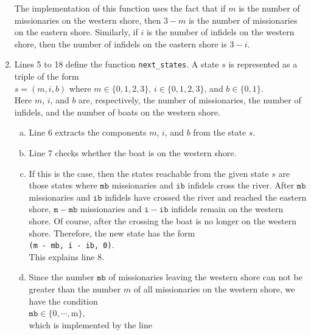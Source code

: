 \begin{enumerate}
      The implementation of this function uses the fact that if $m$ is the number of missionaries on
      the western shore, then $3-m$ is the number of missionaries on the eastern shore.  Similarly,
      if $i$ is the number of infidels on the western shore, then the number of infidels on the
      eastern shore is $3 - i$.
\item Lines 5 to 18 define the function \texttt{next\_states}.  A state $s$ is represented as a triple of
      the form
      \\[0.2cm]
      \hspace*{1.3cm}
      $s = (m, i, b)$ \quad where $m \in \{0,1,2,3\}$, $i \in \{0,1,2,3\}$, and $b \in\{0,1\}$.
      \\[0.2cm]
      Here $m$, $i$, and $b$ are, respectively, the number of missionaries, the number of infidels, and the number
      of boats on the western shore. 
      \begin{enumerate}[(a)]
      \item Line 6 extracts the components $m$, $i$, and $b$ from the state $s$.
      \item Line 7 checks whether the boat is on the western shore.
      \item If this is the case,  then the states reachable from the given state $s$ are those
            states where $\texttt{mb}$ missionaries and $\texttt{ib}$ infidels cross the river.
            After $\texttt{mb}$ missionaries and $\texttt{ib}$ infidels have crossed the river and
            reached the eastern shore, $\mathtt{m} - \mathtt{mb}$ missionaries and $\mathtt{i} - \mathtt{ib}$ infidels
            remain on the western shore.  Of course, after the crossing the boat is no longer on the
            western shore.  Therefore, the new state has the form
            \\[0.2cm]
            \hspace*{1.3cm}
            \texttt{(m - mb, i - ib, 0)}.
            \\[0.2cm]
            This explains line 8.
      \item Since the number $\texttt{mb}$ of missionaries leaving the western shore can not be greater
            than the number $m$ of all missionaries on the western shore, we have the condition
            \\[0.2cm]
            \hspace*{1.3cm}
            $\mathtt{mb} \in \{0,\cdots,\mathrm{m}\}$,
            \\[0.2cm]
            which is implemented by the line

\end{enumerate}
\end{enumerate}
